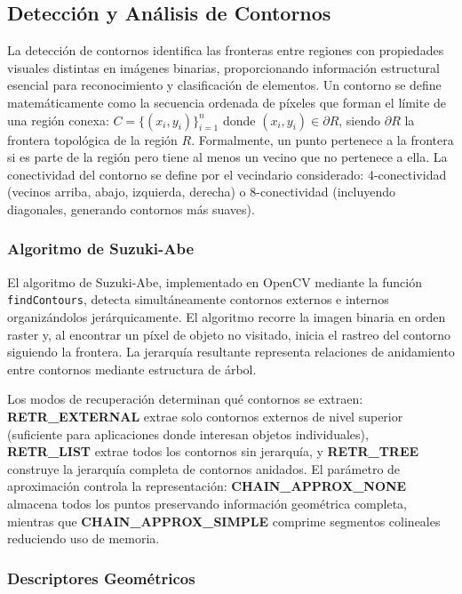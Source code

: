 \subsection{Detección y Análisis de Contornos}

La detección de contornos identifica las fronteras entre regiones con propiedades visuales distintas en imágenes binarias, proporcionando información estructural esencial para reconocimiento y clasificación de elementos. Un contorno se define matemáticamente como la secuencia ordenada de píxeles que forman el límite de una región conexa: $C = \{(x_i, y_i)\}_{i=1}^{n}$ donde $(x_i, y_i) \in \partial R$, siendo $\partial R$ la frontera topológica de la región $R$. Formalmente, un punto pertenece a la frontera si es parte de la región pero tiene al menos un vecino que no pertenece a ella. La conectividad del contorno se define por el vecindario considerado: 4-conectividad (vecinos arriba, abajo, izquierda, derecha) o 8-conectividad (incluyendo diagonales, generando contornos más suaves).

\subsubsection{Algoritmo de Suzuki-Abe}

El algoritmo de Suzuki-Abe, implementado en OpenCV mediante la función \texttt{findContours}, detecta simultáneamente contornos externos e internos organizándolos jerárquicamente. El algoritmo recorre la imagen binaria en orden raster y, al encontrar un píxel de objeto no visitado, inicia el rastreo del contorno siguiendo la frontera. La jerarquía resultante representa relaciones de anidamiento entre contornos mediante estructura de árbol.

Los modos de recuperación determinan qué contornos se extraen: \textbf{RETR\_EXTERNAL} extrae solo contornos externos de nivel superior (suficiente para aplicaciones donde interesan objetos individuales), \textbf{RETR\_LIST} extrae todos los contornos sin jerarquía, y \textbf{RETR\_TREE} construye la jerarquía completa de contornos anidados. El parámetro de aproximación controla la representación: \textbf{CHAIN\_APPROX\_NONE} almacena todos los puntos preservando información geométrica completa, mientras que \textbf{CHAIN\_APPROX\_SIMPLE} comprime segmentos colineales reduciendo uso de memoria.

\subsubsection{Descriptores Geométricos}

